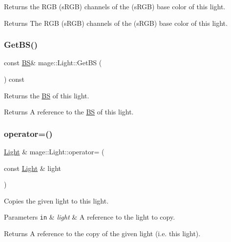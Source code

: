 Returns the R\+GB (s\+R\+GB) channels of the (s\+R\+GB) base color of this light.

\begin{DoxyReturn}{Returns}
The R\+GB (s\+R\+GB) channels of the (s\+R\+GB) base color of this light. 
\end{DoxyReturn}
\hypertarget{classmage_1_1_light_ab2365a76f8f3a2ae2c97263ea556a993}{}\label{classmage_1_1_light_ab2365a76f8f3a2ae2c97263ea556a993} 
\subsubsection{\texorpdfstring{Get\+B\+S()}{GetBS()}}
{\footnotesize\ttfamily const \hyperlink{structmage_1_1_b_s}{BS}\& mage\+::\+Light\+::\+Get\+BS (\begin{DoxyParamCaption}{ }\end{DoxyParamCaption}) const\hspace{0.3cm}{\ttfamily [noexcept]}}

Returns the \hyperlink{structmage_1_1_b_s}{BS} of this light.

\begin{DoxyReturn}{Returns}
A reference to the \hyperlink{structmage_1_1_b_s}{BS} of this light. 
\end{DoxyReturn}
\hypertarget{classmage_1_1_light_ad1267c8d162e2cdead5e3a7d83cef3c1}{}\label{classmage_1_1_light_ad1267c8d162e2cdead5e3a7d83cef3c1} 
\subsubsection{\texorpdfstring{operator=()}{operator=()}\hspace{0.1cm}{\footnotesize\ttfamily [1/2]}}
{\footnotesize\ttfamily \hyperlink{classmage_1_1_light}{Light} \& mage\+::\+Light\+::operator= (\begin{DoxyParamCaption}\item[{const \hyperlink{classmage_1_1_light}{Light} \&}]{light }\end{DoxyParamCaption})\hspace{0.3cm}{\ttfamily [default]}}

Copies the given light to this light.


\begin{DoxyParams}[1]{Parameters}
\mbox{\tt in}  & {\em light} & A reference to the light to copy. \\
\hline
\end{DoxyParams}
\begin{DoxyReturn}{Returns}
A reference to the copy of the given light (i.\+e. this light). 
\end{DoxyReturn}
\hypertarget{classmage_1_1_light_a5fd2edc3fcbcc1dbe7a2620b76cedd25}{}\label{classmage_1_1_light_a5fd2edc3fcbcc1dbe7a2620b76cedd25} 
